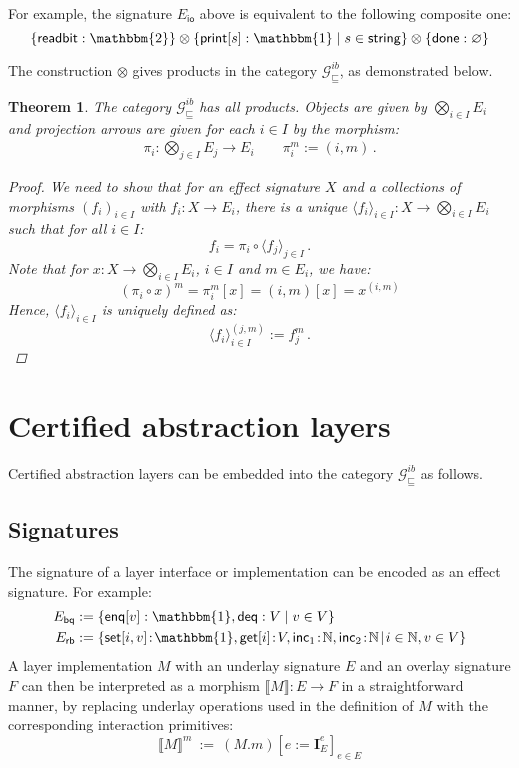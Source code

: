 \documentclass[draft,11pt]{report}
\newtheorem{theorem}{Theorem}[chapter]
\theoremstyle{definition}
\newcommand{\gcat}{\mathcal{G}_{\sqsubseteq}}
\newcommand{\kw}[1]{\ensuremath{ \mathsf{#1} }}
\begin{document}
For example,
the signature $E_\kw{io}$ above is equivalent
to the following composite one:
\[
    \{ \kw{readbit} : \mathbbm{2} \} \otimes
    \{ \kw{print}[s] : \mathbbm{1} \mid s \in \kw{string} \} \otimes
    \{ \kw{done} : \varnothing \}
\]

The construction $\otimes$ gives products in the category $\gcat^{ib}$,
as demonstrated below.

\begin{theorem}
The category $\gcat^{ib}$ has all products.
Objects are given by $\bigotimes_{i \in I} E_i$
and projection arrows are
given for each $i \in I$ by
the morphism:
\begin{gather*}
    \pi_i : \bigotimes_{j \in I} E_j \rightarrow E_i \qquad
    \pi_i^m := (i, m) \,.
\end{gather*}
\begin{proof}
We need to show that for an effect signature $X$
and a collections of morphisms $(f_i)_{i \in I}$ with
$f_i : X \rightarrow E_i$,
there is a unique
$\langle f_i \rangle_{i \in I} : X \rightarrow \bigotimes_{i \in I} E_i$
such that for all $i \in I$:
\[
    f_i = \pi_i \circ \langle f_j \rangle_{j \in I} \,.
\]
Note that for $x : X \rightarrow \bigotimes_{i \in I} E_i$,
$i \in I$ and $m \in E_i$, we have:
\[
    (\pi_i \circ x)^m = \pi_i^m[x] = (i, m) [x] = x^{(i, m)}
\]
Hence, $\langle f_i \rangle_{i \in I}$ is uniquely defined as:
\[
    \langle f_i \rangle_{i \in I}^{(j, m)} := f_j^m \,.
\]
\end{proof}
\end{theorem}


\section{Certified abstraction layers} \label{sec:intspec:cal} %

Certified abstraction layers can be embedded into
the category $\gcat^{ib}$ as follows.

\subsection{Signatures} %

The signature of a layer interface or implementation
can be encoded as an effect signature.
For example:
\begin{align*}
  E_\kw{bq} &:= \{
    \kw{enq}[v] : \mathbbm{1}, \kw{deq} : V \mid
    v \in V \} \\
  E_\kw{rb} &:= \{
    \kw{set}[i, v] \! : \! \mathbbm{1},
    \kw{get}[i] \! : \! V,
    \kw{inc}_1 \! : \! \mathbb{N},
    \kw{inc}_2 \! : \! \mathbb{N} \! \mid \!
    i \in \mathbb{N}, v \in V \}
\end{align*}
A layer implementation $M$ with
an underlay signature $E$ and
an overlay signature $F$
can then be interpreted as a morphism
$\llbracket M \rrbracket : E \rightarrow F$
in a straightforward manner,
by replacing underlay operations
used in the definition of $M$
with the corresponding interaction primitives:
\[
  \llbracket M \rrbracket^m \: := \: (M.m)[e := \mathbf{I}_E^e]_{e \in E}
\]
\end{document}
